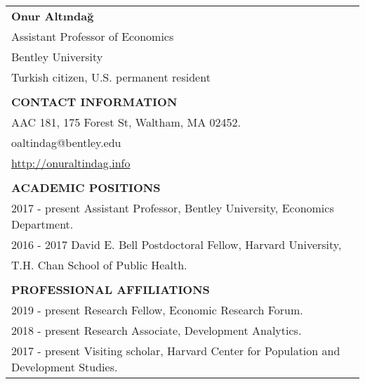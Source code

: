 \documentclass[12 pt]{article}
\begin{document}
\begin{longtable}{ccccc}



\multicolumn{5}{l}{\Large{\textbf{Onur Alt{\i}nda\u{g}}}}     \\


\multicolumn{5}{l}{Assistant Professor of Economics}    \\
\multicolumn{5}{l}{Bentley University}    \\
\multicolumn{5}{l}{Turkish citizen, U.S. permanent resident}    \\

\\
\multicolumn{5}{l}{\textbf{CONTACT INFORMATION}} \\[2 pt]
\multicolumn{5}{l}{AAC 181, 175 Forest St, Waltham, MA 02452.}    \\
\multicolumn{5}{l}{oaltindag@bentley.edu}   \\
\multicolumn{5}{l}{\url{http://onuraltindag.info}}   \\



\\
\multicolumn{5}{l}{\textbf{ACADEMIC POSITIONS}}  \\[2 pt]
 \multicolumn{4}{l}{2017 - present \phantom{00} Assistant Professor, Bentley University, Economics Department.}  \\
 \multicolumn{4}{l}{2016 - 2017 \phantom{0000} David E. Bell Postdoctoral Fellow, Harvard University,}  \\
  \multicolumn{4}{l}{\phantom{2016 - 2017} \phantom{0000}  T.H. Chan School of Public Health.}  \\

\\

 \multicolumn{5}{l}{\textbf{PROFESSIONAL AFFILIATIONS}}  \\[2 pt]


   \multicolumn{4}{l}{2019 - present \phantom{00}Research Fellow, Economic Research Forum.}  \\



  \multicolumn{4}{l}{2018 - present \phantom{00}Research Associate, Development Analytics.}  \\
   \multicolumn{4}{l}{2017 - present \phantom{00}Visiting scholar, Harvard Center for Population and Development Studies.} \\ 


\end{longtable}
\end{document}
